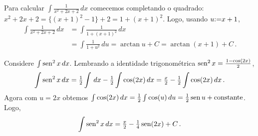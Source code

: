 \begin{ex} Para calcular $\int\frac{1}{x^2+2x+2}\,dx$ comecemos 
completando o quadrado: $x^2+2x+2=\{(x+1)^2-1\}+2=1+(x+1)^2$. Logo,
usando $u{:=} x+1$,
\begin{align*}
\int\frac{1}{x^2+2x+2}\,dx&=\int\frac{1}{1+(x+1)^2}\,dx\\
&=\int\frac{1}{1+u^2}\,du=\arctan u+C=
\arctan(x+1)+C\,.
\end{align*}
\end{ex}

\begin{ex}\label{Ex:sencarre}
Considere $\int \operatorname{sen}^2x\,dx$. Lembrando a identidade trigonométrica
$\operatorname{sen}^2x=\frac{1-\cos(2x)}{2}$, 
$$
\int\operatorname{sen}^2x\,dx=\tfrac12 \int \,dx-\tfrac12 \int \cos(2x)\,dx=
\tfrac{x}{2}-\tfrac12 \int \cos(2x)\,dx\,.
$$ 
Agora com $u=2x$ obtemos $\int \cos(2x)\,dx=\tfrac{1}{2}\int
\cos(u)\,du=\tfrac12 \operatorname{sen} u+\text{constante}$. Logo,
$$
\int \operatorname{sen}^2x\,dx=\tfrac{x}{2}-\tfrac14\operatorname{sen}(2x)+C\,.
$$
\end{ex}




